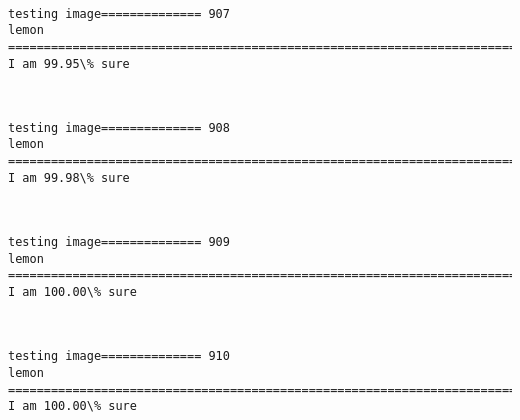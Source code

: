 \documentclass[11pt]{article}
\begin{document}
    \begin{center}
    \end{center}
    { \hspace*{\fill} \\}
    
    \begin{Verbatim}[commandchars=\\\{\}]
testing image============== 907
lemon
============================================================================
I am 99.95\% sure

    \end{Verbatim}

    \begin{center}
    \end{center}
    { \hspace*{\fill} \\}
    
    \begin{Verbatim}[commandchars=\\\{\}]
testing image============== 908
lemon
============================================================================
I am 99.98\% sure

    \end{Verbatim}

    \begin{center}
    \end{center}
    { \hspace*{\fill} \\}
    
    \begin{Verbatim}[commandchars=\\\{\}]
testing image============== 909
lemon
============================================================================
I am 100.00\% sure

    \end{Verbatim}

    \begin{center}
    \end{center}
    { \hspace*{\fill} \\}
    
    \begin{Verbatim}[commandchars=\\\{\}]
testing image============== 910
lemon
============================================================================
I am 100.00\% sure

    \end{Verbatim}
\end{document}
